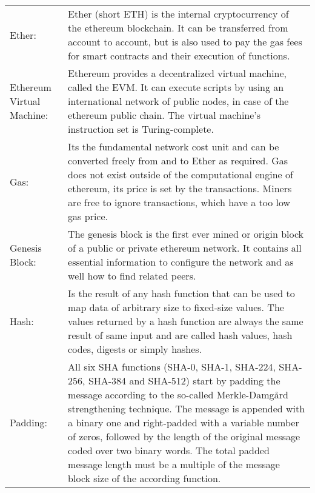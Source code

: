 \begin{center}
	\begin{tabular}{ p{4cm} p{8cm} } 
		Ether: & Ether (short ETH) is the internal cryptocurrency of the ethereum blockchain. It can be transferred from account to account, but is also used to pay the gas fees for smart contracts and their execution of functions. \\
		Ethereum Virtual Machine: & Ethereum provides a decentralized virtual machine, called the \ac{EVM}. It can execute scripts by using an international network of public nodes, in case of the ethereum public chain. The virtual machine's instruction set is Turing-complete. \\
		Gas: & Its the fundamental network cost unit and can be converted freely from and to Ether as required. Gas does not exist outside of the computational engine of ethereum, its price is set by the transactions. Miners are free to ignore transactions, which have a too low gas price. \\
		Genesis Block: & The genesis block is the first ever mined or origin block of a public or private ethereum network. It contains all essential information to configure the network and as well how to find related peers. \\
		Hash: & Is the result of any hash function that can be used to map data of arbitrary size to fixed-size values. The values returned by a hash function are always the same result of same input and are called hash values, hash codes, digests or simply hashes. \\
		Padding: & All six SHA functions (SHA-0, SHA-1, SHA-224, SHA-256, SHA-384 and SHA-512) start by padding the message according to the so-called Merkle-Damg{\aa}rd strengthening technique. The message is appended with a binary one and right-padded with a variable number of zeros, followed by the length of the original message coded over two binary words. The total padded message length must be a multiple of the message block size of the according function. \\
	\end{tabular}
\end{center}

\clearpage

